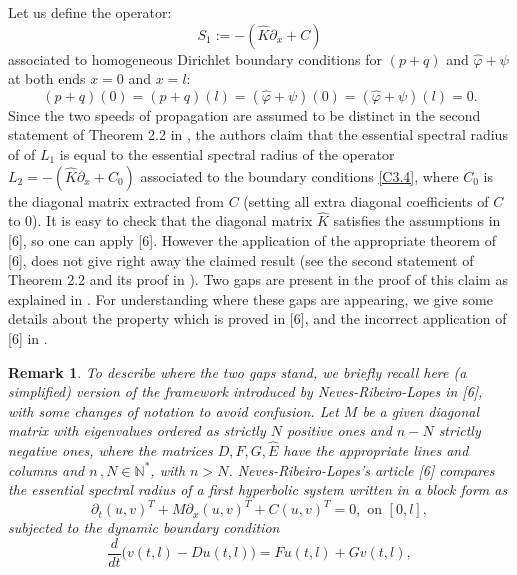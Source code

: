 \documentclass[10pt, english]{article}
\newtheorem{oss}[thm]{Remark}
\begin{document}
{\vskip 2mm

Let us define the operator:
\begin{equation}\label{C3.3}%
S_1:=-(\hat{K}\partial_x +C)
\end{equation}
associated to homogeneous Dirichlet boundary conditions for $(p+q)$ and $\hat{\varphi} + \psi$ at both ends $x=0$ and $x=l$:
\begin{equation}\label{C3.4}%
(p+q)(0)=(p+q)(l)=(\hat{\varphi} + \psi)(0)=(\hat{\varphi} + \psi)(l)=0.
\end{equation}
Since the two speeds of propagation are assumed to be distinct in the second statement of Theorem 2.2 in \cite{SW2003}, the authors claim that the essential spectral radius of of $L_1$ is equal to the essential spectral radius of the operator
 $L_2=-(\hat{K}\partial_x + C_0)$ associated to the boundary conditions \eqref{C3.4}, where $C_0$ is the diagonal matrix extracted from $C$ (setting all extra diagonal coefficients of $C$ to $0$). It is easy to check that the diagonal matrix $\hat{K}$ satisfies the assumptions in [6], so one can apply [6]. However the application of the appropriate theorem of [6], does not give right away the claimed result (see the second statement of Theorem 2.2 and its proof in \cite{SW2003}). Two gaps are present in the proof of this claim as explained in \cite{AB2023I}. For understanding where these gaps are appearing, we give some details about the property which is proved in [6], and the incorrect application of [6] in \cite{SW2003}.
 \begin{oss}\label{Rk4}
 To describe where the two gaps stand, we briefly recall here (a simplified) version of the framework introduced by Neves-Ribeiro-Lopes in [6], with some changes of notation to avoid confusion. Let $M$ be a given diagonal matrix with eigenvalues ordered as strictly $N$ positive ones and $n-N$ strictly negative ones, where the matrices $D, F, G, \widehat{E}$ have the appropriate lines and columns and $n\,, N \in \mathbb{N}^{\ast}$, with $n >N$.
Neves-Ribeiro-Lopes's article [6] compares the essential spectral radius of a first hyperbolic system written in a block form as 
 \begin{equation}\label{C3.5}%
 \partial_t(u,v)^T + M\partial_x(u,v)^T + C(u,v)^T=0, \mbox{ on } [0,l],
 \end{equation}
 subjected to the dynamic boundary condition
 \begin{equation}\label{C3.6}%
 \dfrac{d}{dt}\Big(v(t,l)-Du(t,l)
 \Big)=Fu(t,l) + Gv(t,l), 

\end{equation}
\end{oss}}
\end{document}
